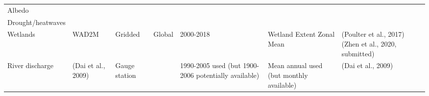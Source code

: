 \documentclass[bg, manuscript]{copernicus}
\begin{document}
\begin{table}
\begin{tabular}{lllllll}
Albedo                             &                                        &                              &                 &                                                       &                                                                      &                                                 \\
Drought/heatwaves                  &                                        &                              &                 &                                                       &                                                                      &                                                 \\
Wetlands                           & WAD2M                            & Gridded                             &  Global               &   2000-2018                                                    &   Wetland Extent Zonal Mean                                                                  &       (Poulter et al., 2017) (Zhen et al., 2020, submitted)                          \\
River discharge                    & (Dai et al., 2009) & Gauge station                &                 & 1990-2005 used (but 1900-2006 potentially  available) & Mean annual used (but monthly available)                             & (Dai et al., 2009)       
\end{tabular}
\end{table}
\end{document}
